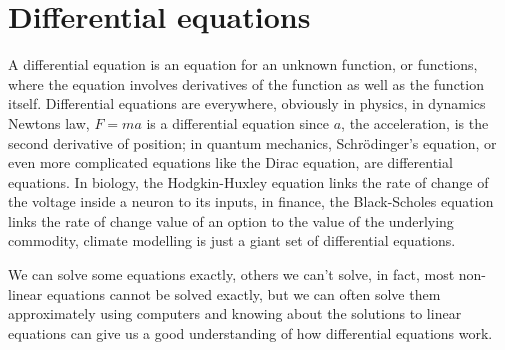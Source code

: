 \documentclass[12pt]{article}
\begin{document}
\section*{Differential equations}
A differential equation is an equation for an unknown function, or
functions, where the equation involves derivatives of the function as
well as the function itself. Differential equations are everywhere,
obviously in physics, in dynamics Newtons law, $F=ma$ is a
differential equation since $a$, the acceleration, is the second
derivative of position; in quantum mechanics, Schr\"{o}dinger's
equation, or even more complicated equations like the Dirac equation,
are differential equations. In biology, the Hodgkin-Huxley equation
links the rate of change of the voltage inside a neuron to its inputs,
in finance, the Black-Scholes equation links the rate of change value
of an option to the value of the underlying commodity, climate
modelling is just a giant set of differential equations.

We can solve some equations exactly, others we can't solve, in fact,
most non-linear equations cannot be solved exactly, but we can often
solve them approximately using computers and knowing about the
solutions to linear equations can give us a good understanding of how
differential equations work.
\end{document}
